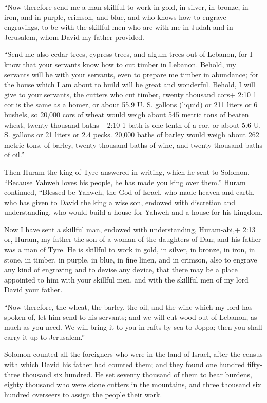  ``Now therefore send me a man skillful to work in gold, in
silver, in bronze, in iron, and in purple, crimson, and blue, and who
knows how to engrave engravings, to be with the skillful men who are
with me in Judah and in Jerusalem, whom David my father provided.

 ``Send me also cedar trees, cypress trees, and algum trees
out of Lebanon, for I know that your servants know how to cut timber in
Lebanon. Behold, my servants will be with your servants, 
even to prepare me timber in abundance; for the house which I am about
to build will be great and wonderful.  Behold, I will give
to your servants, the cutters who cut timber, twenty thousand cors+ 2:10
1 cor is the same as a homer, or about 55.9 U. S. gallons (liquid) or
211 liters or 6 bushels, so 20,000 cors of wheat would weigh about 545
metric tons of beaten wheat, twenty thousand baths+ 2:10 1 bath is one
tenth of a cor, or about 5.6 U. S. gallons or 21 liters or 2.4 pecks.
20,000 baths of barley would weigh about 262 metric tons. of barley,
twenty thousand baths of wine, and twenty thousand baths of oil.''

 Then Huram the king of Tyre answered in writing, which he
sent to Solomon, ``Because Yahweh loves his people, he has made you king
over them.''  Huram continued, ``Blessed be Yahweh, the God
of Israel, who made heaven and earth, who has given to David the king a
wise son, endowed with discretion and understanding, who would build a
house for Yahweh and a house for his kingdom.

 Now I have sent a skillful man, endowed with
understanding, Huram-abi,+ 2:13 or, Huram, my father  the
son of a woman of the daughters of Dan; and his father was a man of
Tyre. He is skillful to work in gold, in silver, in bronze, in iron, in
stone, in timber, in purple, in blue, in fine linen, and in crimson,
also to engrave any kind of engraving and to devise any device, that
there may be a place appointed to him with your skillful men, and with
the skillful men of my lord David your father.

 ``Now therefore, the wheat, the barley, the oil, and the
wine which my lord has spoken of, let him send to his servants;
 and we will cut wood out of Lebanon, as much as you need.
We will bring it to you in rafts by sea to Joppa; then you shall carry
it up to Jerusalem.''

 Solomon counted all the foreigners who were in the land of
Israel, after the census with which David his father had counted them;
and they found one hundred fifty-three thousand six hundred.
 He set seventy thousand of them to bear burdens, eighty
thousand who were stone cutters in the mountains, and three thousand six
hundred overseers to assign the people their work.

